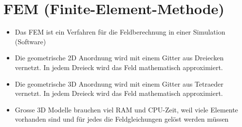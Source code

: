 \section{FEM (Finite-Element-Methode)}
\begin{itemize}
	\item Das FEM ist ein Verfahren für die Feldberechnung in einer Simulation (Software)
	\item Die geometrische 2D Anordnung wird mit einem Gitter aus Dreiecken vernetzt. In jedem Dreieck wird das Feld mathematisch approximiert. 
	\item Die geometrische 3D Anordnung wird mit einem Gitter aus Tetraeder vernetzt. In jedem Dreieck wird das Feld mathematisch approximiert. 
	\item Grosse 3D Modelle brauchen viel RAM und CPU-Zeit, weil viele Elemente vorhanden sind und für jedes die Feldgleichungen gelöst werden müssen
\end{itemize}